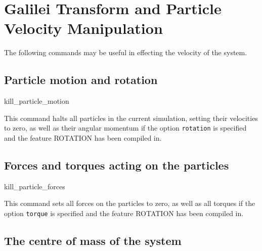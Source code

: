 \section{Galilei Transform and Particle Velocity Manipulation}
\label{sec:Galilei}

The following commands may be useful in effecting the velocity of the
system.

\subsection{Particle motion and rotation}

\begin{pysyntax}
\end{pysyntax}
\begin{essyntax}
  kill_particle_motion 
  \begin{features}
  \end{features}
\end{essyntax}
This command halts all particles in the current simulation, setting
their velocities to zero, as well as their angular momentum if the
option \texttt{rotation} is specified and the feature ROTATION has
been compiled in.

\subsection{Forces and torques acting on the particles}

\begin{pysyntax}
\end{pysyntax}
\begin{essyntax}
  kill_particle_forces 
  \begin{features}
  \end{features}
\end{essyntax}
This command sets all forces on the particles to zero, as well as all
torques if the option \texttt{torque} is specified and the feature
ROTATION has been compiled in. 

\subsection{The centre of mass of the system}

